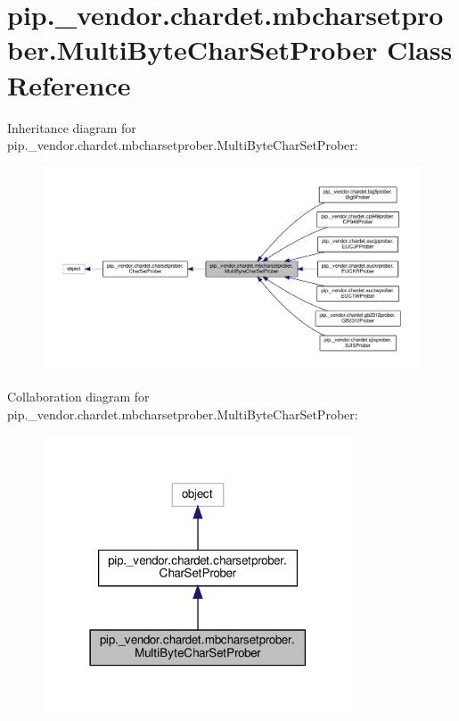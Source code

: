 \hypertarget{classpip_1_1__vendor_1_1chardet_1_1mbcharsetprober_1_1MultiByteCharSetProber}{}\section{pip.\+\_\+vendor.\+chardet.\+mbcharsetprober.\+Multi\+Byte\+Char\+Set\+Prober Class Reference}
\label{classpip_1_1__vendor_1_1chardet_1_1mbcharsetprober_1_1MultiByteCharSetProber}


Inheritance diagram for pip.\+\_\+vendor.\+chardet.\+mbcharsetprober.\+Multi\+Byte\+Char\+Set\+Prober\+:
\nopagebreak
\begin{figure}[H]
\begin{center}
\leavevmode
\includegraphics[width=350pt]{classpip_1_1__vendor_1_1chardet_1_1mbcharsetprober_1_1MultiByteCharSetProber__inherit__graph}
\end{center}
\end{figure}


Collaboration diagram for pip.\+\_\+vendor.\+chardet.\+mbcharsetprober.\+Multi\+Byte\+Char\+Set\+Prober\+:
\nopagebreak
\begin{figure}[H]
\begin{center}
\leavevmode
\includegraphics[width=261pt]{classpip_1_1__vendor_1_1chardet_1_1mbcharsetprober_1_1MultiByteCharSetProber__coll__graph}
\end{center}
\end{figure}
